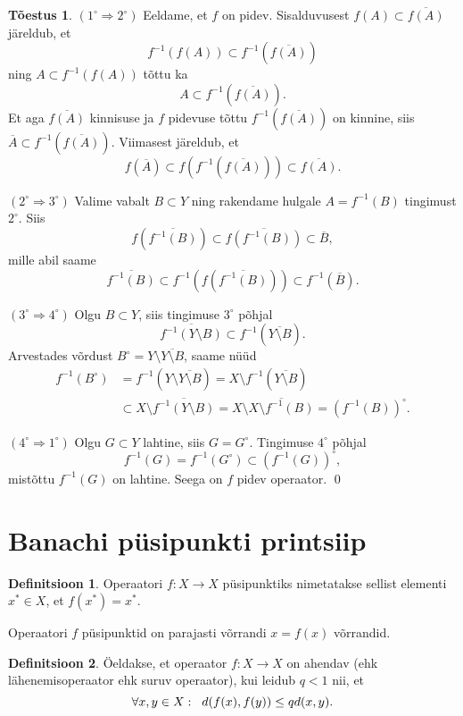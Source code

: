 \documentclass{article}[12pt]
\newcommand{\h}{\hspace{0.2cm}}
\theoremstyle{definition}
\newtheorem{definition}{Definitsioon}[section]
\theoremstyle{definition}
\theoremstyle{definition}
\theoremstyle{break}
\newtheorem*{toestus}{Tõestus}
\begin{document}
\begin{toestus}
	$(1^\circ\Rightarrow 2^\circ)$
	Eeldame, et $f$ on pidev.
	Sisalduvusest $f(A)\subset\overline{f(A)}$ järeldub, et 
	$$
		f^{-1}(f(A))\subset f^{-1}(\overline{f(A)})
	$$
	ning $A\subset f^{-1}(f(A))$ tõttu ka 
	$$
		A\subset f^{-1}(\overline{f(A)}).
	$$
	Et aga $\overline{f(A)}$ kinnisuse ja $f$ pidevuse tõttu $f^{-1}(\overline{f(A)})$ on kinnine, siis $\overline{A}\subset f^{-1}(\overline{f(A)})$. Viimasest järeldub, et
	\[
		f(\overline{A})\subset f(f^{-1}(\overline{f(A)})) \subset \overline{f(A)}.
	\]

	$(2^\circ\Rightarrow 3^\circ)$
	Valime vabalt $B\subset Y$ ning rakendame hulgale $A=f^{-1}(B)$ tingimust $2^\circ$.
	Siis
	\[
		f(\overline{f^{-1}(B)}) \subset \overline{f(f^{-1}(B))} \subset \overline{B},
	\]
	mille abil saame
	\[
		\overline{f^{-1}(B)} \subset f^{-1}(f(\overline{f^{-1}(B)}))\subset f^{-1}(\overline{B}).
	\]

	$(3^\circ\Rightarrow 4^\circ)$
	Olgu $B\subset Y$, siis tingimuse $3^\circ$ põhjal
	\[
		\overline{f^{-1}(Y\setminus B)} \subset f^{-1}(\overline{Y\setminus B}).
	\]
	Arvestades võrdust $B^\circ = Y\setminus \overline{Y\setminus B}$, saame nüüd
	\begin{align*}
		f^{-1}(B^\circ) &= f^{-1}(Y\setminus \overline{Y\setminus B}) = X\setminus f^{-1}(\overline{Y\setminus B}) \\
		&\subset X\setminus \overline{f^{-1}(Y\setminus B)} = X\setminus \overline{X \setminus f^{-1}(B)} = (f^{-1}(B))^\circ.
	\end{align*}

	$(4^\circ\Rightarrow 1^\circ)$
	Olgu $G\subset Y$ lahtine, siis $G = G^\circ$.
	Tingimuse $4^\circ$ põhjal
	\[
		f^{-1}(G) = f^{-1}(G^\circ) \subset (f^{-1}(G))^\circ,
	\]
	mistõttu $f^{-1}(G)$ on lahtine.
	Seega on $f$ pidev operaator.
	\qed
\end{toestus}

\section{Banachi püsipunkti printsiip}

\begin{definition}
	Operaatori $f:X\rightarrow X$ püsipunktiks nimetatakse sellist elementi $x^*\in X$, et $f(x^*) = x^*$.
\end{definition}

Operaatori $f$ püsipunktid on parajasti võrrandi $x=f(x)$ võrrandid.

\begin{definition}
	Öeldakse, et operaator $f:X\rightarrow X$ on ahendav (ehk lähenemisoperaator ehk suruv operaator), kui leidub $q < 1$ nii, et
	\[
		\forall x,y\in X:\h d(f(x),f(y)) \leq qd(x,y).
	\]
\end{definition}
\end{document}
